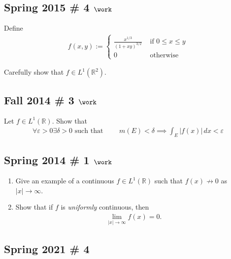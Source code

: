 \hypertarget{spring-2015-4-work}{%
\subsection{\texorpdfstring{Spring 2015 \# 4
\(\work\)}{Spring 2015 \# 4 \textbackslash work}}\label{spring-2015-4-work}}

Define
\begin{align*}
f(x, y):=\left\{\begin{array}{ll}{\frac{x^{1 / 3}}{(1+x y)^{3 / 2}}} & {\text { if } 0 \leq x \leq y} \\ {0} & {\text { otherwise }}\end{array}\right.
\end{align*}

Carefully show that \(f \in L^1({\mathbb{R}}^2)\).

\hypertarget{fall-2014-3-work}{%
\subsection{\texorpdfstring{Fall 2014 \# 3
\(\work\)}{Fall 2014 \# 3 \textbackslash work}}\label{fall-2014-3-work}}

Let \(f\in L^1({\mathbb{R}})\). Show that
\begin{align*}
\forall\varepsilon > 0 \exists \delta > 0 \text{ such that } \qquad 
m(E) < \delta 
\implies 
\int _{E} |f(x)| \, dx < \varepsilon
\end{align*}

\hypertarget{spring-2014-1-work}{%
\subsection{\texorpdfstring{Spring 2014 \# 1
\(\work\)}{Spring 2014 \# 1 \textbackslash work}}\label{spring-2014-1-work}}

\begin{enumerate}
\def\labelenumi{\arabic{enumi}.}
\item
  Give an example of a continuous \(f\in L^1({\mathbb{R}})\) such that
  \(f(x) \not\to 0\) as\({\left\lvert {x} \right\rvert} \to \infty\).
\item
  Show that if \(f\) is \emph{uniformly} continuous, then
  \begin{align*}
  \lim_{{\left\lvert {x} \right\rvert} \to \infty} f(x) = 0.
  \end{align*}
\end{enumerate}

\hypertarget{spring-2021-4}{%
\subsection{Spring 2021 \# 4}\label{spring-2021-4}}


